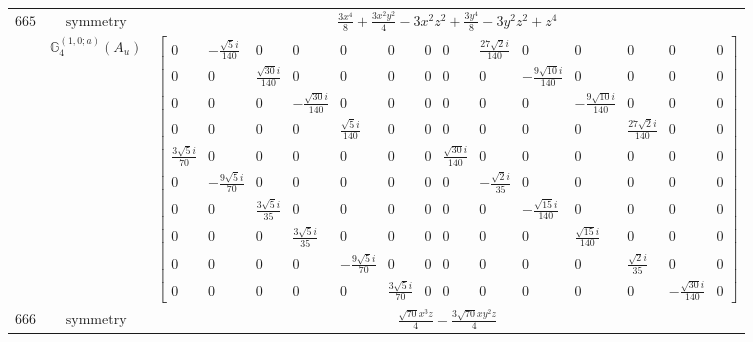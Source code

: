 \documentclass[fleqn,8pt,landscape]{jsarticle}
\begin{document}
\begin{longtable}{ccc}
$ 665 $ & $ \text{symmetry} $ & $ \frac{3 x^{4}}{8} + \frac{3 x^{2} y^{2}}{4} - 3 x^{2} z^{2} + \frac{3 y^{4}}{8} - 3 y^{2} z^{2} + z^{4} $ \\
$  $ & $ \mathbb{G}_{4}^{(1,0;a)}(A_{u}) $ & $ \begin{bmatrix} 0 & - \frac{\sqrt{5} i}{140} & 0 & 0 & 0 & 0 & 0 & 0 & \frac{27 \sqrt{2} i}{140} & 0 & 0 & 0 & 0 & 0 \\ 0 & 0 & \frac{\sqrt{30} i}{140} & 0 & 0 & 0 & 0 & 0 & 0 & - \frac{9 \sqrt{10} i}{140} & 0 & 0 & 0 & 0 \\ 0 & 0 & 0 & - \frac{\sqrt{30} i}{140} & 0 & 0 & 0 & 0 & 0 & 0 & - \frac{9 \sqrt{10} i}{140} & 0 & 0 & 0 \\ 0 & 0 & 0 & 0 & \frac{\sqrt{5} i}{140} & 0 & 0 & 0 & 0 & 0 & 0 & \frac{27 \sqrt{2} i}{140} & 0 & 0 \\ \frac{3 \sqrt{5} i}{70} & 0 & 0 & 0 & 0 & 0 & 0 & \frac{\sqrt{30} i}{140} & 0 & 0 & 0 & 0 & 0 & 0 \\ 0 & - \frac{9 \sqrt{5} i}{70} & 0 & 0 & 0 & 0 & 0 & 0 & - \frac{\sqrt{2} i}{35} & 0 & 0 & 0 & 0 & 0 \\ 0 & 0 & \frac{3 \sqrt{5} i}{35} & 0 & 0 & 0 & 0 & 0 & 0 & - \frac{\sqrt{15} i}{140} & 0 & 0 & 0 & 0 \\ 0 & 0 & 0 & \frac{3 \sqrt{5} i}{35} & 0 & 0 & 0 & 0 & 0 & 0 & \frac{\sqrt{15} i}{140} & 0 & 0 & 0 \\ 0 & 0 & 0 & 0 & - \frac{9 \sqrt{5} i}{70} & 0 & 0 & 0 & 0 & 0 & 0 & \frac{\sqrt{2} i}{35} & 0 & 0 \\ 0 & 0 & 0 & 0 & 0 & \frac{3 \sqrt{5} i}{70} & 0 & 0 & 0 & 0 & 0 & 0 & - \frac{\sqrt{30} i}{140} & 0 \end{bmatrix} $ \\ \hline
$ 666 $ & $ \text{symmetry} $ & $ \frac{\sqrt{70} x^{3} z}{4} - \frac{3 \sqrt{70} x y^{2} z}{4} $ \\

\end{longtable}
\end{document}
